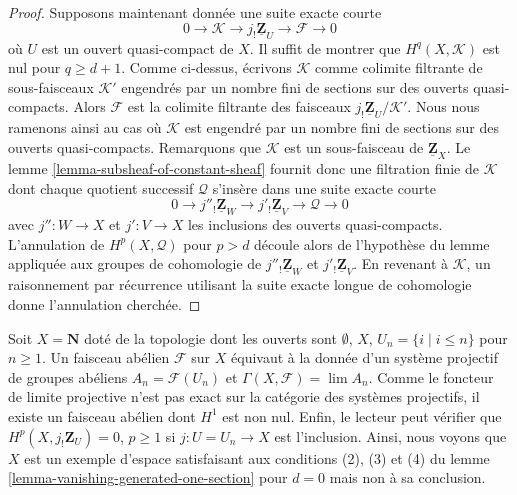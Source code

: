 \begin{proof}
Supposons maintenant donnée une suite exacte courte
$$
0 \to \mathcal{K} \to j_!\underline{\mathbf{Z}}_U \to \mathcal{F} \to 0
$$
où $U$ est un ouvert quasi-compact de $X$. Il suffit de montrer que $H^q(X, \mathcal{K})$ est nul pour $q \geq d + 1$. Comme ci-dessus, écrivons $\mathcal{K}$ comme colimite filtrante de sous-faisceaux $\mathcal{K}'$ engendrés par un nombre fini de sections sur des ouverts quasi-compacts. Alors $\mathcal{F}$ est la colimite filtrante des faisceaux $j_!\underline{\mathbf{Z}}_U/\mathcal{K}'$. Nous nous ramenons ainsi au cas où $\mathcal{K}$ est engendré par un nombre fini de sections sur des ouverts quasi-compacts. Remarquons que $\mathcal{K}$
est un sous-faisceau de $\underline{\mathbf{Z}}_X$. Le lemme \ref{lemma-subsheaf-of-constant-sheaf} fournit donc une filtration finie de $\mathcal{K}$ dont chaque quotient successif $\mathcal{Q}$ s'insère dans une suite exacte courte
$$
0 \to j''_!\underline{\mathbf{Z}}_W \to
j'_!\underline{\mathbf{Z}}_V \to \mathcal{Q} \to 0
$$
avec $j'' : W \to X$ et $j' : V \to X$ les inclusions des ouverts quasi-compacts. L'annulation de $H^p(X, \mathcal{Q})$ pour $p > d$ découle alors de l'hypothèse du lemme appliquée aux groupes de cohomologie de $j''_!\underline{\mathbf{Z}}_W$ et $j'_!\underline{\mathbf{Z}}_V$. En revenant à $\mathcal{K}$, un raisonnement par récurrence utilisant la suite exacte longue de cohomologie donne l'annulation cherchée.

\end{proof}

\begin{example}

\label{example-datta}

Soit $X = \mathbf{N}$ doté de la topologie dont les ouverts sont
$\emptyset$, $X$, $U_n = \{i \mid i \leq n\}$ pour $n \geq 1$. Un faisceau abélien $\mathcal{F}$ sur $X$ équivaut à la donnée d'un système projectif de groupes abéliens $A_n = \mathcal{F}(U_n)$ et
$\Gamma(X, \mathcal{F}) = \lim A_n$. Comme le foncteur de limite projective n'est pas exact sur la catégorie des systèmes projectifs, il existe un faisceau abélien dont $H^1$ est non nul. Enfin, le lecteur peut vérifier que $H^p(X, j_!\mathbf{Z}_U) = 0$,
$p \geq 1$ si $j : U = U_n \to X$ est l'inclusion. Ainsi, nous voyons que $X$ est un exemple d'espace satisfaisant aux conditions (2), (3) et (4) du lemme \ref{lemma-vanishing-generated-one-section} pour $d = 0$
mais non à sa conclusion.

\end{example}

